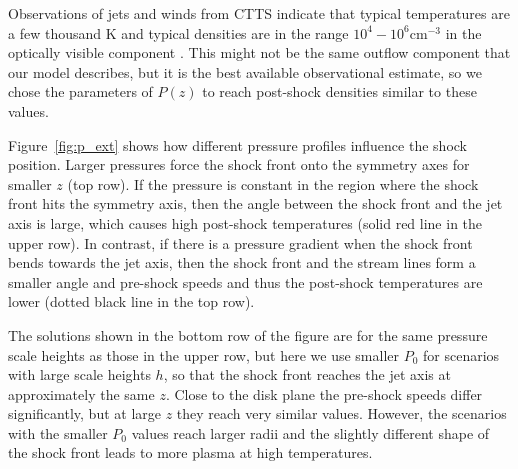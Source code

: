 Observations of jets and winds from CTTS indicate that typical temperatures are a few thousand K and typical densities are in the range $10^4-10^6 \mathrm{ cm}^{-3}$ in the optically visible component \citep[e.g.][]{2000A&A...356L..41L,2007ApJ...657..897K}. This might not be the same outflow component that our model describes, but it is the best available observational estimate, so we chose the parameters of $P(z)$ to reach post-shock densities similar to these values.

Figure~\ref{fig:p_ext} shows how different pressure profiles influence the shock position. Larger pressures force the shock front onto the symmetry axes for smaller $z$ (top row). If the pressure is constant in the region where the shock front hits the symmetry axis, then the angle between the shock front and the jet axis is large, which causes high post-shock temperatures (solid red line in the upper row). In contrast, if there is a pressure gradient when the shock front bends towards the jet axis, then the shock front and the stream lines form a smaller angle and pre-shock speeds and thus the post-shock temperatures are lower (dotted black line in the top row).

The solutions shown in the bottom row of the figure are for the same pressure scale heights as those in the upper row, but here we use smaller $P_0$ for scenarios with large scale heights $h$, so that the shock front reaches the jet axis at approximately the same $z$. Close to the disk plane the pre-shock speeds differ significantly, but at large $z$ they reach very similar values. However, the scenarios with the smaller $P_0$ values reach larger radii and the slightly different shape of the shock front leads to more plasma at high temperatures.